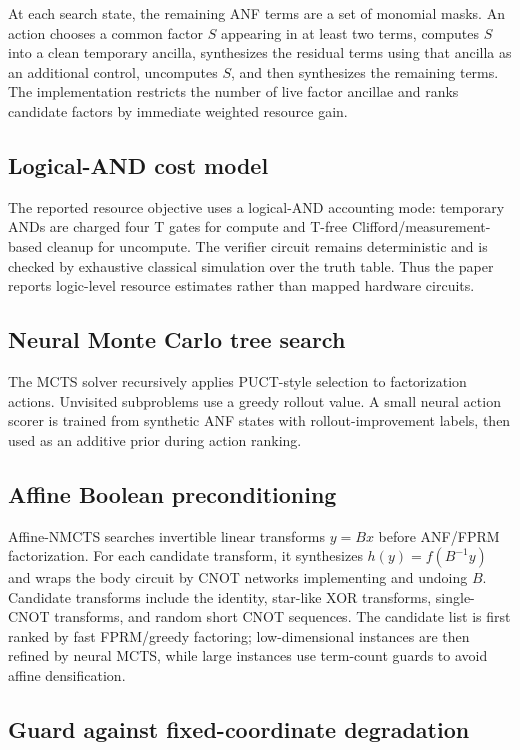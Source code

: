 \documentclass[11pt]{article}
\newcommand{\affinemethod}{Affine-NMCTS}
\begin{document}
At each search state, the remaining ANF terms are a set of monomial masks.  An
action chooses a common factor $S$ appearing in at least two terms, computes
$S$ into a clean temporary ancilla, synthesizes the residual terms using that
ancilla as an additional control, uncomputes $S$, and then synthesizes the
remaining terms.  The implementation restricts the number of live factor
ancillae and ranks candidate factors by immediate weighted resource gain.

\subsection{Logical-AND cost model}

The reported resource objective uses a logical-AND accounting mode: temporary
ANDs are charged four T gates for compute and T-free Clifford/measurement-based
cleanup for uncompute.  The verifier circuit remains deterministic and is
checked by exhaustive classical simulation over the truth table.  Thus the
paper reports logic-level resource estimates rather than mapped hardware
circuits.

\subsection{Neural Monte Carlo tree search}

The MCTS solver recursively applies PUCT-style selection to factorization
actions.  Unvisited subproblems use a greedy rollout value.  A small neural
action scorer is trained from synthetic ANF states with rollout-improvement
labels, then used as an additive prior during action ranking.

\subsection{Affine Boolean preconditioning}

\affinemethod{} searches invertible linear transforms $y=Bx$ before ANF/FPRM
factorization.  For each candidate transform, it synthesizes
$h(y)=f(B^{-1}y)$ and wraps the body circuit by CNOT networks implementing and
undoing $B$.  Candidate transforms include the identity, star-like XOR
transforms, single-CNOT transforms, and random short CNOT sequences.  The
candidate list is first ranked by fast FPRM/greedy factoring; low-dimensional
instances are then refined by neural MCTS, while large instances use term-count
guards to avoid affine densification.

\subsection{Guard against fixed-coordinate degradation}
\end{document}
